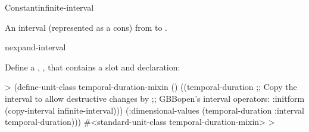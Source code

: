 \documentclass[10pt,twoside,english,pdftex]{article}
\begin{document}
\begin{functiondoc}{Constant}{infinite-interval}{}%

\fnsyntax

\fnpurpose An interval (represented as a cons) from  to
.

\fnpackage {}

\fnmodule {}

\begin{alsos}{nexpand-interval}
\end{alsos}

\fnexample
%
%
%
%
Define a , , that contains a
 slot and  declaration:
%
\W\supp
\begin{example}
  > (define-unit-class temporal-duration-mixin ()
      ((temporal-duration 
         ;; Copy the interval to allow destructive changes by
         ;; GBBopen's interval operators:
         :initform (copy-interval infinite-interval)))
      (:dimensional-values
       (temporal-duration :interval temporal-duration)))
  #<standard-unit-class temporal-duration-mixin>
  >
\end{example}

\end{functiondoc}

\end{document}
